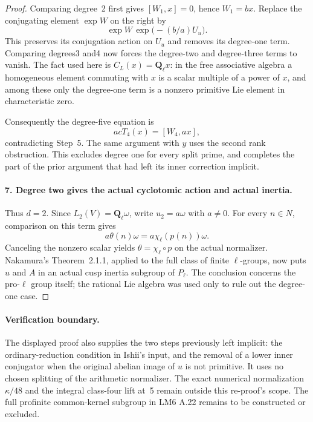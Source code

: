 \begin{proof}
Comparing degree~2 first gives $[W_1,x]=0$, hence $W_1=b x$. Replace the conjugating element $\exp W$ on the right by
\[
 \exp W\,\exp\bigl(-(b/a)U_u\bigr).
\]
This preserves its conjugation action on $U_u$ and removes its degree-one term. Comparing degrees3 and4 now forces the degree-two and degree-three terms to vanish. The fact used here is $C_L(x)=\mathbf Q_\ell x$: in the free associative algebra a homogeneous element commuting with $x$ is a scalar multiple of a power of $x$, and among these only the degree-one term is a nonzero primitive Lie element in characteristic zero.

Consequently the degree-five equation is
\[
 acT_4(x)=[W_4,a x],
\]
contradicting Step~5. The same argument with $y$ uses the second rank obstruction. This excludes degree one for every split prime, and completes the part of the prior argument that had left its inner correction implicit.

\paragraph{7. Degree two gives the actual cyclotomic action and actual inertia.}
Thus $d=2$. Since $L_2(V)=\mathbf Q_\ell\omega$, write $u_2=a\omega$ with $a\ne0$. For every $n\in N$, comparison on this term gives
\[
 a\theta(n)\omega=a\chi_\ell(p(n))\omega.
\]
Canceling the nonzero scalar yields $\theta=\chi_\ell\circ p$ on the actual normalizer. Nakamura's Theorem~2.1.1\cite[p.~94]{AuditNakamura1994}, applied to the full class of finite $\ell$-groups, now puts $u$ and $A$ in an actual cusp inertia subgroup of $P_\ell$. The conclusion concerns the pro-$\ell$ group itself; the rational Lie algebra was used only to rule out the degree-one case.

\end{proof}

\paragraph{Verification boundary.}
The displayed proof also supplies the two steps previously left implicit: the ordinary-reduction condition in Ishii's input, and the removal of a lower inner conjugator when the original abelian image of $u$ is not primitive. It uses no chosen splitting of the arithmetic normalizer. The exact numerical normalization $\kappa/48$ and the integral class-four lift at~5 remain outside this re-proof's scope. The full profinite common-kernel subgroup in LM6 A.22 remains to be constructed or excluded.

